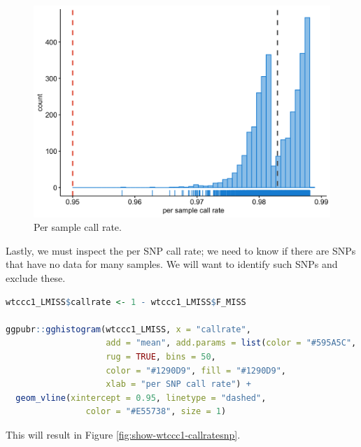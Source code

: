 \documentclass[
]{book}
\begin{document}
\begin{figure}

{\centering \includegraphics[width=18.67in]{img/WTCCC1 callrate samples} 

}

\caption{Per sample call rate.}\label{fig:show-wtccc1-callratesample}
\end{figure}

Lastly, we must inspect the per SNP call rate; we need to know if there are SNPs that have no data for many samples. We will want to identify such SNPs and exclude these.

\begin{lstlisting}[language=R]
wtccc1_LMISS$callrate <- 1 - wtccc1_LMISS$F_MISS

ggpubr::gghistogram(wtccc1_LMISS, x = "callrate",
                    add = "mean", add.params = list(color = "#595A5C", linetype = "dashed", size = 1),
                    rug = TRUE, bins = 50,
                    color = "#1290D9", fill = "#1290D9",
                    xlab = "per SNP call rate") +
  geom_vline(xintercept = 0.95, linetype = "dashed",
                color = "#E55738", size = 1)
\end{lstlisting}

This will result in Figure \ref{fig:show-wtccc1-callratesnp}.
\end{document}

